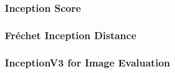 \subsubsection[Inception Score - IS]{Inception Score}
\subsubsection[Fréchet Inception Distance - FID]{Fréchet Inception Distance}
\subsubsection[InceptionV3 Model]{InceptionV3 for Image Evaluation}










\newpage
